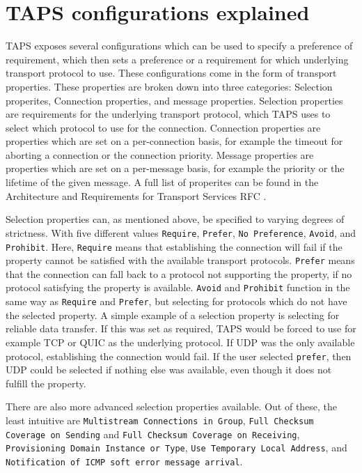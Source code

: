 \section{TAPS configurations explained}

TAPS exposes several configurations which can be used to specify
a preference of requirement, which then sets a preference or a
requirement for which underlying transport protocol to use.
These configurations come in the form of transport properties.
These properties are broken down into three categories:
Selection properites, Connection properties, and message
properties. Selection properties are requirements for the
underlying transport protocol, which TAPS uses to select which
protocol to use for the connection. Connection properties are
properties which are set on a per-connection basis, for example
the timeout for aborting a connection or the connection
priority. Message properties are properties which are set on a
per-message basis, for example the priority or the lifetime of
the given message. A full list of properites can be found in the
Architecture and Requirements for Transport Services RFC
\cite{paulyArchitectureRequirementsTransport2025}.

Selection properties can, as mentioned above, be specified to
varying degrees of strictness. With five different values
\texttt{Require}, \texttt{Prefer}, \texttt{No Preference},
\texttt{Avoid}, and \texttt{Prohibit}. Here, \texttt{Require}
means that establishing the connection will fail if the property
cannot be satisfied with the available transport protocols.
\texttt{Prefer} means that the connection can fall back to a
protocol not supporting the property, if no protocol satisfying
the property is available. \texttt{Avoid} and \texttt{Prohibit}
function in the same way as \texttt{Require} and
\texttt{Prefer}, but selecting for protocols which do not have
the selected property. A simple example of a selection property
is selecting for reliable data transfer. If this was set as
required, TAPS would be forced to use for example TCP or QUIC as
the underlying protocol. If UDP was the only available protocol,
establishing the connection would fail. If the user selected
\texttt{prefer}, then UDP could be selected if nothing else was
available, even though it does not fulfill the property.

There are also more advanced selection properties available. Out
of these, the least intuitive are \texttt{Multistream
	Connections in Group}, \texttt{Full Checksum Coverage on
	Sending} and \texttt{Full Checksum Coverage on Receiving},
\texttt{Provisioning Domain Instance or Type}, \texttt{Use
	Temporary Local Address}, and \texttt{Notification of ICMP soft
	error message arrival}.

